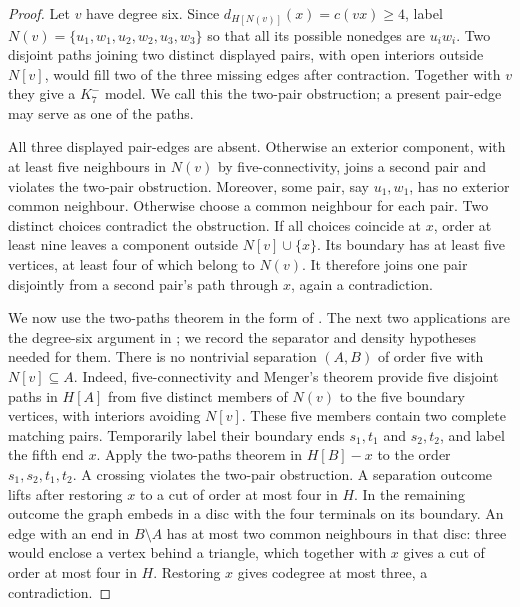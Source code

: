 \begin{proof}
Let $v$ have degree six.  Since $d_{H[N(v)]}(x)=c(vx)\geq4$, label
$N(v)=\{u_1,w_1,u_2,w_2,u_3,w_3\}$ so that all its possible nonedges
are $u_iw_i$.  Two disjoint paths joining two distinct displayed pairs, with open
interiors outside $N[v]$,
would fill two of the three missing edges after contraction.  Together
with $v$ they give a $K_7^{-}$ model.  We call this the two-pair
obstruction; a present pair-edge may serve as one of the paths.

All three displayed pair-edges are absent.  Otherwise an exterior
component, with at least five neighbours in $N(v)$ by five-connectivity,
joins a second pair and violates the two-pair obstruction.  Moreover,
some pair, say $u_1,w_1$, has no exterior common neighbour.  Otherwise
choose a common neighbour for each pair.  Two distinct choices contradict
the obstruction.  If all choices coincide at $x$, order at least nine
leaves a component outside $N[v]\cup\{x\}$.  Its boundary has at least
five vertices, at least four of which belong to $N(v)$.  It therefore
joins one pair disjointly from a second pair's path through $x$, again a
contradiction.

We now use the two-paths theorem in the form of
\cite[Theorem~13]{NorinTotschnig2025}.  The next two applications are the
degree-six argument in \cite[Claims~3.12--3.15]{NorinTotschnig2025}; we
record the separator and density hypotheses needed for them.  There is
no nontrivial separation $(A,B)$ of order five with $N[v]\subseteq A$.
Indeed, five-connectivity and Menger's theorem provide five disjoint paths
in $H[A]$ from five distinct members of $N(v)$ to the five boundary
vertices, with interiors avoiding $N[v]$.  These five members contain
two complete matching pairs.  Temporarily label their boundary ends
$s_1,t_1$ and $s_2,t_2$, and label the fifth end $x$.  Apply the two-paths
theorem in $H[B]-x$ to the order $s_1,s_2,t_1,t_2$.  A crossing violates
the two-pair obstruction.  A separation outcome lifts after restoring
$x$ to a cut of order at most four in $H$.  In the remaining outcome the
graph embeds in a disc with the four terminals on its boundary.  An edge
with an end in $B\setminus A$ has at most two common neighbours in that
disc: three would enclose a vertex behind a triangle, which together
with $x$ gives a cut of order at most four in $H$.  Restoring $x$ gives
codegree at most three, a contradiction.


\end{proof}
